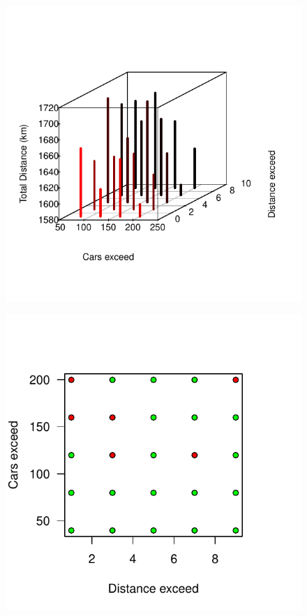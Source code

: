 \documentclass[12]{article}
\begin{document}
\begin{figure}[H]
  \captionsetup{justification=centering}
   \centering
    \includegraphics[scale=0.8]{Results/data_6_3.pdf}
      \caption{}
      \label{fig:data_6_3}
  \end{figure}
    \vspace{1cm}

\begin{figure}[H]
  \captionsetup{justification=centering}
   \centering
    \includegraphics[scale=0.8]{Results/data_6_4.pdf}
      \caption{}
      \label{fig:data_6_4}
  \end{figure}
    \vspace{1cm}
\end{document}
